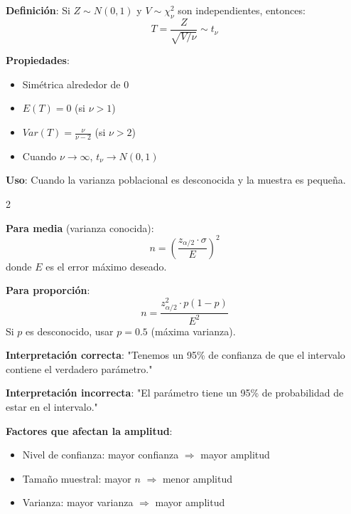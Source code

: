 \documentclass[10pt,a4paper]{article}
\begin{document}
\begin{tcolorbox}[title=Distribución t de Student]
    \textbf{Definición}: Si $Z \sim N(0,1)$ y $V \sim \chi^2_\nu$ son independientes, entonces:
    \[
        T = \frac{Z}{\sqrt{V/\nu}} \sim t_\nu
    \]
    
    \textbf{Propiedades}:
    \begin{itemize}
        \item Simétrica alrededor de 0
        \item $E(T) = 0$ (si $\nu > 1$)
        \item $Var(T) = \frac{\nu}{\nu-2}$ (si $\nu > 2$)
        \item Cuando $\nu \to \infty$, $t_\nu \to N(0,1)$
    \end{itemize}
    
    \textbf{Uso}: Cuando la varianza poblacional es desconocida y la muestra es pequeña.
\end{tcolorbox}

\begin{multicols}{2}
    \begin{tcolorbox}[title=Tamaño Muestral, equal height group=IC3]
        \textbf{Para media} (varianza conocida):
        \[
            n = \left(\frac{z_{\alpha/2} \cdot \sigma}{E}\right)^2
        \]
        donde $E$ es el error máximo deseado.
        
        \textbf{Para proporción}:
        \[
            n = \frac{z_{\alpha/2}^2 \cdot p(1-p)}{E^2}
        \]
        Si $p$ es desconocido, usar $p = 0.5$ (máxima varianza).
    \end{tcolorbox}
    \begin{tcolorbox}[title=Interpretación y Consideraciones, equal height group=IC3]
        \textbf{Interpretación correcta}: "Tenemos un 95\% de confianza de que el intervalo contiene el verdadero parámetro."
        
        \textbf{Interpretación incorrecta}: "El parámetro tiene un 95\% de probabilidad de estar en el intervalo."
        
        \textbf{Factores que afectan la amplitud}:
        \begin{itemize}
            \item Nivel de confianza: mayor confianza $\Rightarrow$ mayor amplitud
            \item Tamaño muestral: mayor $n$ $\Rightarrow$ menor amplitud
            \item Varianza: mayor varianza $\Rightarrow$ mayor amplitud
        \end{itemize}
    \end{tcolorbox}
\end{multicols}
\end{document}
